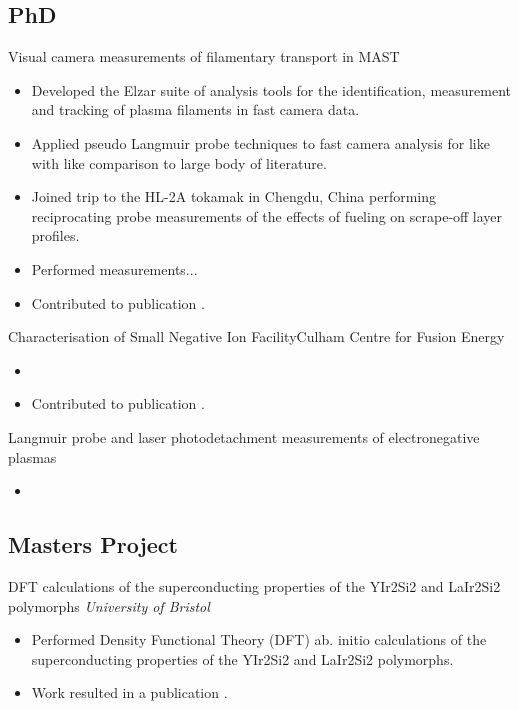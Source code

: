 \documentclass[11pt,a4paper,sans]{moderncv}        %
\begin{document}
\subsection{PhD}
{Visual camera measurements of filamentary transport in MAST}{}{}{}
{\begin{itemize}%
\item Developed the Elzar suite of analysis tools for the identification, measurement and tracking of plasma filaments in fast camera data.
\item Applied pseudo Langmuir probe techniques to fast camera analysis for like with like comparison to large body of literature.
\item Joined trip to the HL-2A tokamak in Chengdu, China performing reciprocating probe measurements of the effects of fueling on scrape-off layer profiles.
\end{itemize}}

{\begin{itemize}%
\item Performed measurements...
\item Contributed to publication \cite{Cartry2017}.
\end{itemize}}

{Characterisation of Small Negative Ion Facility}{\newline Culham Centre for Fusion Energy}
{}
{}{\begin{itemize}%
\item 
\item Contributed to publication \cite{Zacks2017}.
\end{itemize}}

{Langmuir probe and laser photodetachment measurements of electronegative plasmas}
{}
{}
{}
{
\begin{itemize}%
\item 
\end{itemize}
}

\subsection{Masters Project}
{DFT calculations of the superconducting properties of the YIr2Si2 and LaIr2Si2 polymorphs}
{\newline \emph{University of Bristol}}
{}
{}
{\begin{itemize}%
\item Performed Density Functional Theory (DFT) ab. initio calculations of the superconducting properties of the YIr2Si2 and LaIr2Si2 polymorphs.
\item Work resulted in a publication \cite{Billington2014}.
\end{itemize}}
\end{document}
